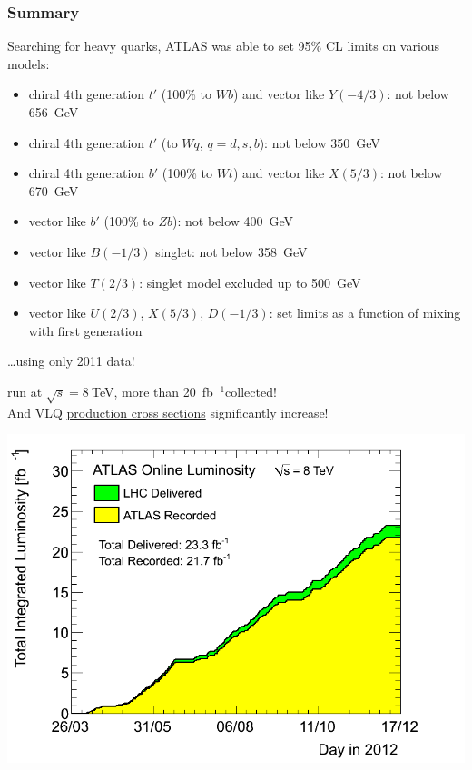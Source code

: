 \documentclass[xcolor=dvipsnames,10pt]{beamer}
\newcommand{\ifb}{~fb$^{-1}$}
\begin{document}
\begin{frame}\frametitle{Summary}
\footnotesize\centering



\begin{minipage}{.5\textwidth}
\centering
Searching for heavy quarks, ATLAS was able to set 95\% CL limits on various models:

\begin{itemize}[<+->]\scriptsize
\item[\cite{ATLAS:2012qe}] chiral 4th generation $t'$ (100\% to $Wb$) and  vector like $Y(-4/3)$: not below \alert{656~GeV}
\item[\cite{Aad:2012bt}] chiral 4th generation $t'$ (to $Wq$, $q=d,s,b$): not below \alert{350~GeV}
\item[\cite{ATLAS-CONF-2012-130}] chiral 4th generation $b'$ (100\% to $Wt$) and vector like $X(5/3)$: not below \alert{670~GeV}
\item[\cite{:2012aka}] vector like $b'$ (100\% to $Zb$): not below \alert{400~GeV}
\item[\cite{:2012aka}] vector like $B(-1/3)$ singlet: not below \alert{358~GeV}
\item[\cite{ATLAS:2012qe}] vector like $T(2/3)$: singlet model excluded up to \alert{500~GeV}
\item[\cite{ATLAS-CONF-2012-137}] vector like $U(2/3)$, $X(5/3)$, $D(-1/3)$: set limits as a function of mixing with first generation
\end{itemize}

\pause
\dots using only 2011 data!

\end{minipage}\begin{minipage}{.5\textwidth}
\centering
{} run at $\sqrt{s}=8~$TeV, more than 20\ifb collected!\\{\scriptsize And VLQ \hyperlink{vlqXsec}{production cross sections} significantly increase!}

\includegraphics[width=.9\textwidth,height=.35\textheight]{pics/sumLumiByDay2012}


\end{minipage}
\end{frame}
\end{document}
